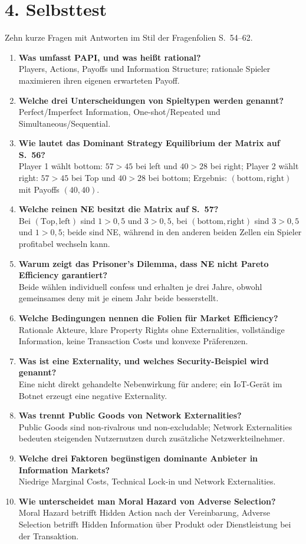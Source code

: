 \documentclass[11pt,a4paper]{article}
\newcommand{\qa}[2]{\item \textbf{#1}\\#2\par\vspace{5pt}}
\begin{document}
\section*{4. Selbsttest}
{\small Zehn kurze Fragen mit Antworten im Stil der Fragenfolien S.~54--62.}
\begin{enumerate}[leftmargin=*,itemsep=7pt,topsep=6pt]
\qa{Was umfasst PAPI, und was heißt rational?}{Players, Actions, Payoffs und Information Structure; rationale Spieler maximieren ihren eigenen erwarteten Payoff.}
\qa{Welche drei Unterscheidungen von Spieltypen werden genannt?}{Perfect/Imperfect Information, One-shot/Repeated und Simultaneous/Sequential.}
\qa{Wie lautet das Dominant Strategy Equilibrium der Matrix auf S.~56?}{Player 1 wählt bottom: $57>45$ bei left und $40>28$ bei right; Player 2 wählt right: $57>45$ bei Top und $40>28$ bei bottom; Ergebnis: $(\mathrm{bottom},\mathrm{right})$ mit Payoffs $(40,40)$.}
\qa{Welche reinen NE besitzt die Matrix auf S.~57?}{Bei $(\mathrm{Top},\mathrm{left})$ sind $1>0{,}5$ und $3>0{,}5$, bei $(\mathrm{bottom},\mathrm{right})$ sind $3>0{,}5$ und $1>0{,}5$; beide sind NE, während in den anderen beiden Zellen ein Spieler profitabel wechseln kann.}
\qa{Warum zeigt das Prisoner's Dilemma, dass NE nicht Pareto Efficiency garantiert?}{Beide wählen individuell confess und erhalten je drei Jahre, obwohl gemeinsames deny mit je einem Jahr beide besserstellt.}
\qa{Welche Bedingungen nennen die Folien für Market Efficiency?}{Rationale Akteure, klare Property Rights ohne Externalities, vollständige Information, keine Transaction Costs und konvexe Präferenzen.}
\qa{Was ist eine Externality, und welches Security-Beispiel wird genannt?}{Eine nicht direkt gehandelte Nebenwirkung für andere; ein IoT-Gerät im Botnet erzeugt eine negative Externality.}
\qa{Was trennt Public Goods von Network Externalities?}{Public Goods sind non-rivalrous und non-excludable; Network Externalities bedeuten steigenden Nutzernutzen durch zusätzliche Netzwerkteilnehmer.}
\qa{Welche drei Faktoren begünstigen dominante Anbieter in Information Markets?}{Niedrige Marginal Costs, Technical Lock-in und Network Externalities.}
\qa{Wie unterscheidet man Moral Hazard von Adverse Selection?}{Moral Hazard betrifft Hidden Action nach der Vereinbarung, Adverse Selection betrifft Hidden Information über Produkt oder Dienstleistung bei der Transaktion.}
\end{enumerate}
\end{document}
